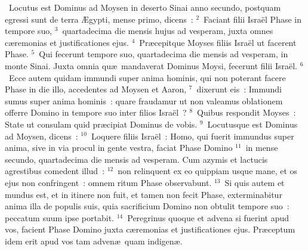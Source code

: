 ~Locutus est Dominus ad Moysen in deserto Sinai anno secundo, postquam egressi sunt de terra \AE gypti, mense primo, dicens~:
${}^{2}$~Faciant filii Isra\"el Phase in tempore suo,
${}^{3}$~quartadecima die mensis hujus ad vesperam, juxta omnes c\ae remonias et justificationes ejus.
${}^{4}$~Pr\ae cepitque Moyses filiis Isra\"el ut facerent Phase.
${}^{5}$~Qui fecerunt tempore suo, quartadecima die mensis ad vesperam, in monte Sinai. Juxta omnia qu\ae\ mandaverat Dominus Moysi, fecerunt filii Isra\"el.
${}^{6}$~Ecce autem quidam immundi super anima hominis, qui non poterant facere Phase in die illo, accedentes ad Moysen et Aaron,
${}^{7}$~dixerunt eis~: Immundi sumus super anima hominis~: quare fraudamur ut non valeamus oblationem offerre Domino in tempore suo inter filios Isra\"el~?
${}^{8}$~Quibus respondit Moyses~: State ut consulam quid pr\ae cipiat Dominus de vobis.
${}^{9}$~Locutusque est Dominus ad Moysen, dicens~:
${}^{10}$~Loquere filiis Isra\"el~: Homo, qui fuerit immundus super anima, sive in via procul in gente vestra, faciat Phase Domino
${}^{11}$~in mense secundo, quartadecima die mensis ad vesperam. Cum azymis et lactucis agrestibus comedent illud~:
${}^{12}$~non relinquent ex eo quippiam usque mane, et os ejus non confringent~: omnem ritum Phase observabunt.
${}^{13}$~Si quis autem et mundus est, et in itinere non fuit, et tamen non fecit Phase, exterminabitur anima illa de populis suis, quia sacrificium Domino non obtulit tempore suo~: peccatum suum ipse portabit.
${}^{14}$~Peregrinus quoque et advena si fuerint apud vos, facient Phase Domino juxta c\ae remonias et justificationes ejus. Pr\ae ceptum idem erit apud vos tam adven\ae\ quam indigen\ae .


